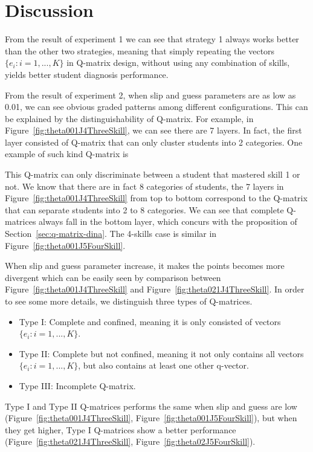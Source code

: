 \documentclass{edm_template}
\newcommand{\Michel}[1]{{\textcolor{purple}{[#1]}}}
\begin{document}
%  

\section{Discussion}
From the result of experiment 1 we can see that strategy 1 always works better than the other two strategies, meaning that simply repeating the vectors $\{e_{i}:i=1,...,K\}$ in Q-matrix design, without using any combination of skills, yields better student diagnosis performance. %

From the result of experiment 2, when slip and guess parameters are as low as 0.01, we can see obvious graded patterns among different configurations. This can be explained by the distinguishability of Q-matrix. For example, in Figure~\ref{fig:theta001J4ThreeSkill}, we can see there are 7 layers. In fact, the first layer consisted of Q-matrix that can only cluster students into 2 categories. One example of such kind Q-matrix is
\centerline{
}

This Q-matrix can only discriminate between a student that mastered skill 1 or not. We know that there are in fact 8 categories of students, the 7 layers in Figure~\ref{fig:theta001J4ThreeSkill} from top to bottom correspond to the Q-matrix that can separate students into 2 to 8 categories. We can see that complete Q-matrices always fall in the bottom layer, which concurs with the proposition of Section~\ref{sec:q-matrix-dina}. The 4-skills case is similar in Figure~\ref{fig:theta001J5FourSkill}.

When slip and guess parameter increase, it makes the points becomes more divergent which can be easily seen by comparison between Figure~\ref{fig:theta001J4ThreeSkill} and Figure~\ref{fig:theta021J4ThreeSkill}. In order to see some more details, we distinguish three types of Q-matrices. 
\begin{itemize}
\item Type I: Complete and confined, meaning it is only consisted of vectors $\{e_{i}:i=1,...,K\}$.
\item Type II: Complete but not confined, meaning it not only contains all vectors $\{e_{i}:i=1,...,K\}$, but also contains at least one other q-vector.
\item Type III: Incomplete Q-matrix.
\end{itemize}
Type I and Type II Q-matrices performs the same when slip and guess are low (Figure~\ref{fig:theta001J4ThreeSkill}, Figure~\ref{fig:theta001J5FourSkill}), but when they get higher, Type I Q-matrices show a better performance (Figure~\ref{fig:theta021J4ThreeSkill}, Figure~\ref{fig:theta02J5FourSkill}).
\end{document}
